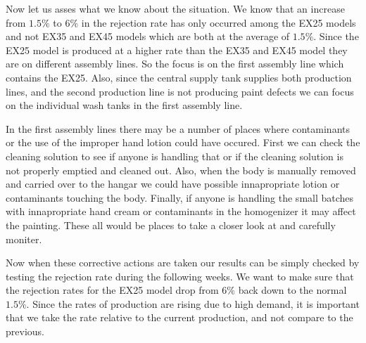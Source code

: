\documentclass[12pt]{article}
\begin{document}
Now let us asses what we know about the situation. We know that an increase from $1.5\%$ to $6\%$ in the rejection rate has only occurred among the EX25 models and not EX35 and EX45 models which are both at the average of $1.5\%$. Since the EX25 model is produced at a higher rate than the EX35 and EX45 model they are on different assembly lines. So the focus is on the first assembly line which contains the EX25. Also, since the central supply tank supplies both production lines, and the second production line is not producing paint defects we can focus on the individual wash tanks in the first assembly line. 

In the first assembly lines there may be a number of places where contaminants or the use of the improper hand lotion could have occured. First we can check the cleaning solution to see if anyone is handling that or if the cleaning solution is not properly emptied and cleaned out. Also, when the body is manually removed and carried over to the hangar we could have possible innapropriate lotion or contaminants touching the body. Finally, if anyone is handling the small batches with innapropriate hand cream or contaminants in the homogenizer it may affect the painting. These all would be places to take a closer look at and carefully moniter. 

Now when these corrective actions are taken our results can be simply checked by testing the rejection rate during the following weeks. We want to make sure that the rejection rates for the EX25 model drop from $6\%$ back down to the normal $1.5\%$. Since the rates of production are rising due to high demand, it is important that we take the rate relative to the current production, and not compare to the previous. 
\end{document}
